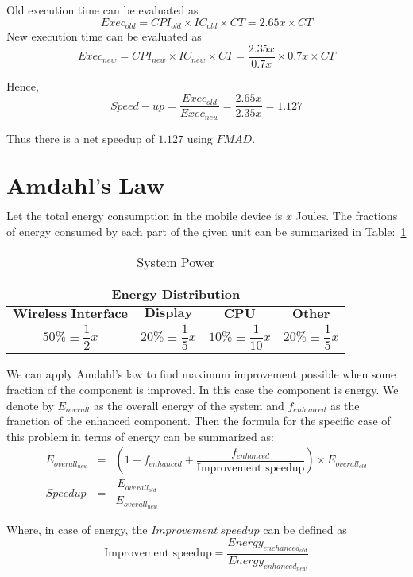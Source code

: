 \documentclass{tufte-handout}
\begin{document}
	Old execution time can be evaluated as
	\[Exec_{old} = CPI_{old} \times IC_{old} \times CT = 2.65x \times CT\]
	New execution time can be evaluated as
	\[Exec_{new} = CPI_{new} \times IC_{new} \times CT = \dfrac{2.35x}{0.7x} \times 0.7x \times CT\]

	Hence, 
	\[
		Speed-up = \dfrac{Exec_{old}}{Exec_{new}} = \dfrac{2.65x}{2.35x} = 1.127
	\]

	Thus there is a net speedup of $1.127$ using $FMAD$.

\newpage
\section{$\textbf{Amdahl's Law}$}
	Let the total energy consumption in the mobile device is $x$ Joules. The fractions of energy consumed by each part of the given unit can be summarized in Table:~\ref{tab:frac-tab}
	\begin{table}[!htb]
	    \centering
	    \selectfont
		\renewcommand{\arraystretch}{3.0}
		\label{tab:frac-tab}
	    \begin{tabular}{c|c|c|c|}
	      \toprule
		  \multicolumn{4}{|c|}{Energy Distribution}  \\
	      \midrule 
		  $\textbf{Wireless Interface}$ & $\textbf{Display}$ & $\textbf{CPU}$ & $\textbf{Other}$ \\  %
		  $50\% \equiv \dfrac{1}{2}x$  & $20\% \equiv \dfrac{1}{5}x$ & $10\% \equiv \dfrac{1}{10}x$ & $20\% \equiv \dfrac{1}{5}x$ \\
	      \bottomrule
	    \end{tabular}
	    \caption{ System Power }
	  \end{table}

	  We can apply Amdahl's law to find maximum improvement possible when some fraction of the component is improved. In this case the component is energy. We denote by $E_{overall}$ as the overall energy of the system and $f_{enhanced}$ as the franction of the enhanced component. Then the formula for the specific case of this problem in terms of energy can be summarized as:
	  \begin{eqnarray*}
	  	E_{overall_{new}} &=& (1 - f_{enhanced} + \dfrac{f_{enhanced}}{\mbox{Improvement speedup}}) \times E_{overall_{old}} \\
		Speedup &=& \dfrac{E_{overall_{old}}}{E_{overall_{new}}}
	  \end{eqnarray*}

	  Where, in case of energy, the $Improvement\ speedup$ can be defined as
	  \[
	  	\mbox{Improvement speedup} = \dfrac{Energy_{enehanced_{old}}}{Energy_{enhanced_{new}}}
	  \]
\end{document}
